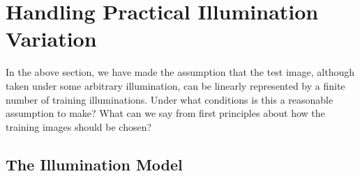 \documentclass[12pt,journal,draftcls,letterpaper,onecolumn]{IEEEtran}
\begin{document}
\section{Handling Practical Illumination Variation}\label{sec:illumination}
In the above section, we have made the assumption that the test image, although taken under some arbitrary illumination, can be linearly represented by a finite number of training illuminations.  Under what conditions is this a reasonable assumption to make?  What can we say from first principles about how the training images should be chosen?

\subsection{The Illumination Model}

\end{document}
